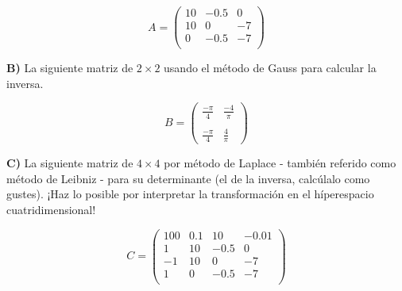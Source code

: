\documentclass[a4paper]{article}
\begin{document}
$$A = \begin{pmatrix} 
    10 & -0.5 & 0 \\
    10 & 0 & -7 \\ 
    0 & -0.5 & -7 \\
\end{pmatrix}$$ 

\vspace{5mm}
\textbf{B)} La siguiente matriz de $ 2 \times 2$ usando el método de Gauss para calcular la inversa. 

$$ B = \begin{pmatrix} 
    \frac{-\pi}{4} & \frac{-4}{\pi} \\ \\
    \frac{-\pi}{4} & \frac{4}{\pi} \end{pmatrix}$$ 

\vspace{5mm}
\textbf{C)} La siguiente matriz de $4 \times 4$ por método de Laplace - también referido como método de Leibniz -  para su determinante (el de la inversa, calcúlalo como gustes). ¡Haz lo posible por interpretar la transformación en el híperespacio cuatridimensional! 

$$ C = \begin{pmatrix} 
    100 & 0.1 & 10 & -0.01  \\
    1 & 10 & -0.5 & 0 \\
    -1 & 10 & 0 & -7 \\
    1 & 0 & -0.5 & - 7 \\
\end{pmatrix}$$
\end{document}
